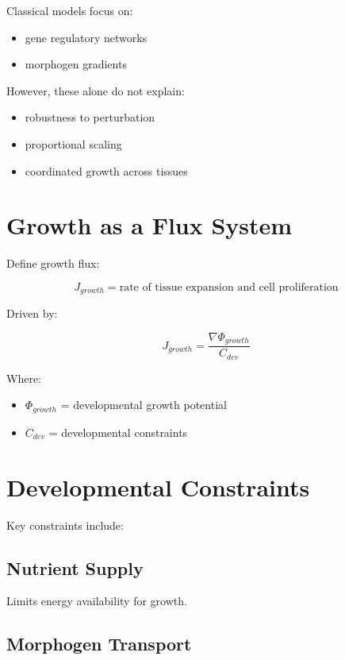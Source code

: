 \documentclass[11pt]{article}
\begin{document}
Classical models focus on:

\begin{itemize}
    \item gene regulatory networks
    \item morphogen gradients
\end{itemize}

However, these alone do not explain:

\begin{itemize}
    \item robustness to perturbation
    \item proportional scaling
    \item coordinated growth across tissues
\end{itemize}

\section{Growth as a Flux System}

Define growth flux:

\begin{equation}
J_{growth} = \text{rate of tissue expansion and cell proliferation}
\end{equation}

Driven by:

\begin{equation}
J_{growth} = \frac{\nabla \Phi_{growth}}{C_{dev}}
\end{equation}

Where:

\begin{itemize}
    \item $\Phi_{growth}$ = developmental growth potential
    \item $C_{dev}$ = developmental constraints
\end{itemize}

\section{Developmental Constraints}

Key constraints include:

\subsection{Nutrient Supply}

Limits energy availability for growth.

\subsection{Morphogen Transport}
\end{document}
